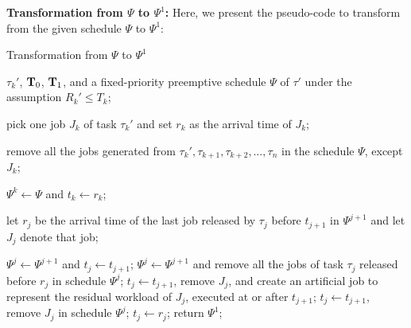 {\bf Transformation from $\Psi$ to $\Psi^1$:}
Here, we present the pseudo-code to transform from the given schedule $\Psi$
to $\Psi^1$:
\begin{algorithm}[h]
  \caption{Transformation from $\Psi$ to $\Psi^1$}
     \begin{algorithmic}[1]\footnotesize
       \INPUT $\tau_k'$, ${\bf T}_0$, ${\bf T}_1$, and a
       fixed-priority preemptive schedule $\Psi$ of $\tau'$ under the
       assumption $R_k' \leq T_k$;

       \STATE pick one job $J_k$ of task $\tau_k'$ and set $r_k$ as
       the arrival time of $J_k$;

    \STATE remove all the jobs generated from $\tau_k', \tau_{k+1}, \tau_{k+2}, \ldots,
    \tau_n$ in the schedule $\Psi$, except $J_k$;

    \STATE $\Psi^k \leftarrow \Psi$ and $t_k \leftarrow r_k$; 

    
    \STATE let $r_j$ be the arrival time of the last
    job released by $\tau_j$ before $t_{j+1}$ in $\Psi^{j+1}$ and let
    $J_{j}$ denote that job;

    \STATE $\Psi^j \leftarrow \Psi^{j+1}$ and $t_j \leftarrow
    t_{j+1}$;  
    \ELSE
    \STATE $\Psi^j \leftarrow \Psi^{j+1}$ and remove all the jobs of task $\tau_j$ released before $r_j$
    in schedule $\Psi^j$;
     \STATE  $t_j \leftarrow t_{j+1}$, remove $J_j$, and  create an
     artificial job to represent the residual workload of $J_j$,
     executed at or after $t_{j+1}$; 
     \ELSE
     \STATE  $t_j \leftarrow t_{j+1}$, remove $J_j$ in schedule $\Psi^j$; 
     \ELSE
     \STATE  $t_j \leftarrow r_j$; 
     \ENDIF   
    \ENDIF
    \ENDIF
    \ENDFOR
    \STATE return $\Psi^1$;
  \end{algorithmic}
\end{algorithm}

